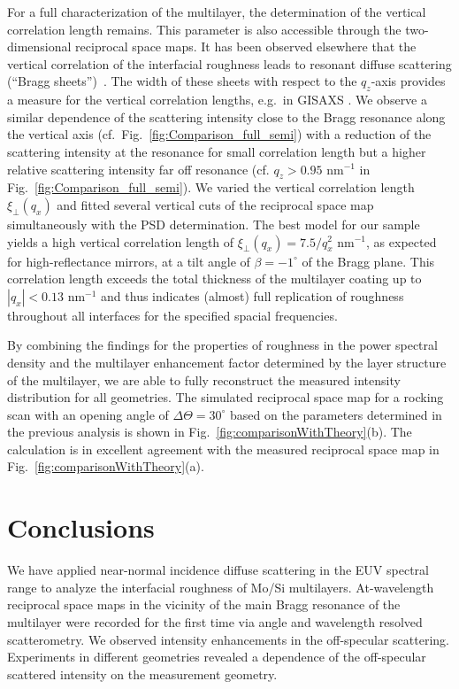 \documentclass[twocolumn,osajnl,showpacs,superscriptaddress,11pt]{revtex4-1}
\begin{document}
For a full characterization of the multilayer, the determination of the vertical correlation length remains. This parameter is also accessible through the two-dimensional reciprocal space maps. It has been observed elsewhere that the vertical correlation of the interfacial roughness leads to resonant diffuse scattering (``Bragg sheets'')~\cite{PhysRevB.49.10668}. The width of these sheets with respect to the $q_z$-axis provides a measure for the vertical correlation lengths, e.g.~in GISAXS \cite{Siffalovic200919}. We observe a similar dependence of the scattering intensity close to the Bragg resonance along the vertical axis (cf.~Fig.~\ref{fig:Comparison_full_semi}) with a reduction of the scattering intensity at the resonance for small correlation length but a higher relative scattering intensity far off resonance (cf. $q_z>0.95$ nm$^{-1}$ in Fig.~\ref{fig:Comparison_full_semi}). We varied the vertical correlation length $\xi_\perp(q_x)$ and fitted several vertical cuts of the reciprocal space map simultaneously with the PSD determination. The best model for our sample yields a high vertical correlation length of $\xi_\perp(q_x)=7.5/q_x^2$ nm$^{-1}$, as expected for high-reflectance mirrors, at a tilt angle of $\beta=-1^\circ$ of the Bragg plane. 
This correlation length exceeds the total thickness of the multilayer coating up to $|q_x|<0.13$ nm$^{-1}$ and thus indicates (almost) full replication of roughness throughout all interfaces for the specified spacial frequencies.

By combining the findings for the properties of roughness in the power spectral density and the multilayer enhancement factor determined by the layer structure of the multilayer, we are able to fully reconstruct the measured intensity distribution for all geometries. The simulated reciprocal space map for a rocking scan with an opening angle of $\Delta\Theta = 30^\circ$ based on the parameters determined in the previous analysis is shown in Fig.~\ref{fig:comparisonWithTheory}(b). The calculation is in excellent agreement with the measured reciprocal space map in Fig.~\ref{fig:comparisonWithTheory}(a). 


\section{Conclusions} We have applied near-normal incidence diffuse scattering in the EUV spectral range to analyze the interfacial roughness of Mo/Si multilayers. At-wavelength reciprocal space maps in the vicinity of the main Bragg resonance of the multilayer were recorded for the first time via angle and wavelength resolved scatterometry. We observed intensity enhancements in the off-specular scattering. Experiments in different geometries revealed a dependence of the off-specular scattered intensity on the measurement geometry.
\end{document}
